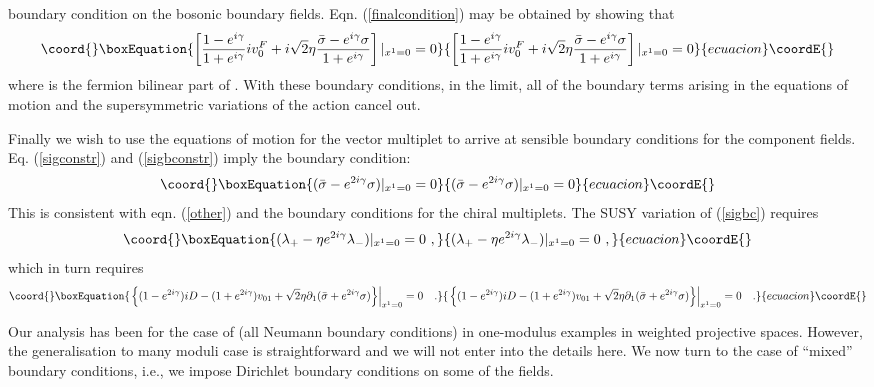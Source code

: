 \documentclass[a4paper,12pt]{article}
\begin{document}
boundary condition on the bosonic boundary fields.  
%
Eqn. (\ref{finalcondition}) may be obtained by showing that 
\begin{equation}\coord{}\boxEquation{
\left[\frac{1-e^{i\gamma}}{1+e^{i\gamma}}iv_0^F
+i{\sqrt 2}\eta
\frac{{\bar \sigma}-e^{i\gamma}\sigma}{1+e^{i\gamma}}
\right]|_{x^1=0}=0
\label{other}
}{
\left[\frac{1-e^{i\gamma}}{1+e^{i\gamma}}iv_0^F
+i{\sqrt 2}\eta
\frac{{\bar \sigma}-e^{i\gamma}\sigma}{1+e^{i\gamma}}
\right]|_{x^1=0}=0
}{ecuacion}\coordE{}\end{equation} 
where \coordHE{} is the fermion bilinear part of \coordHE{}. 
With these boundary conditions, in the \coordHE{} limit,
all of the boundary terms arising in the 
equations of motion and the supersymmetric variations of the action
cancel out. 

Finally we wish to use the equations of motion
for the vector multiplet to arrive at sensible
boundary conditions for the component fields.
Eq. (\ref{sigconstr}) and (\ref{sigbconstr}) imply the boundary condition:
\begin{equation}\coord{}\boxEquation{
({\bar \sigma}-e^{2i\gamma}\sigma)|_{x^1=0}=0
\label{sigbc}
}{
({\bar \sigma}-e^{2i\gamma}\sigma)|_{x^1=0}=0
}{ecuacion}\coordE{}\end{equation}
This is consistent with eqn. (\ref{other}) and the boundary conditions
for the chiral multiplets.
The SUSY variation of (\ref{sigbc}) requires 
\begin{equation}\coord{}\boxEquation{
(\lambda_+-\eta e^{2i\gamma}\lambda_-)|_{x^1=0}=0\ ,
\label{lambdabc}
}{
(\lambda_+-\eta e^{2i\gamma}\lambda_-)|_{x^1=0}=0\ ,
}{ecuacion}\coordE{}\end{equation}
which in turn requires
\begin{equation}\coord{}\boxEquation{
\left.\left\{(1-e^{2i\gamma})iD-(1+e^{2i\gamma})v_{01}
+{\sqrt 2}\eta \partial_1({\bar \sigma}+e^{2i\gamma}\sigma)
\right\}\right|_{x^1=0}=0 \quad.
}{
\left.\left\{(1-e^{2i\gamma})iD-(1+e^{2i\gamma})v_{01}
+{\sqrt 2}\eta \partial_1({\bar \sigma}+e^{2i\gamma}\sigma)
\right\}\right|_{x^1=0}=0 \quad.
}{ecuacion}\coordE{}\end{equation}

Our analysis has been for the case of (all Neumann
boundary conditions) in one-modulus examples
in weighted projective spaces. However, the generalisation to many moduli
case is straightforward and we will not enter into the details here.
We now turn to the case of ``mixed'' boundary conditions, i.e., we
impose Dirichlet boundary conditions on some of the fields.
\end{document}
